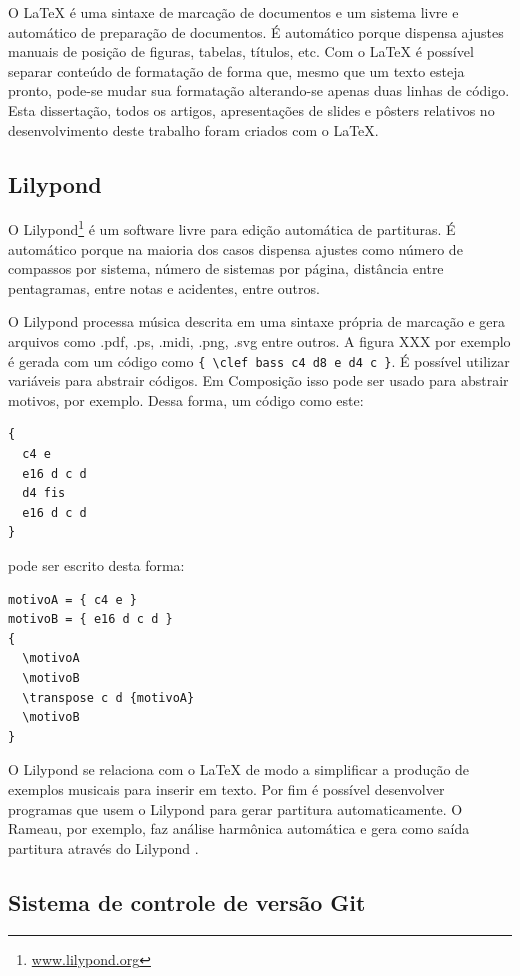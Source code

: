 O \LaTeX{} é uma sintaxe de marcação de documentos e um sistema livre
e automático de preparação de documentos. É automático porque dispensa
ajustes manuais de posição de figuras, tabelas, títulos, etc. Com o
\LaTeX{} é possível separar conteúdo de formatação de forma que, mesmo
que um texto esteja pronto, pode-se mudar sua formatação alterando-se
apenas duas linhas de código. Esta dissertação, todos os artigos,
apresentações de slides e pôsters relativos no desenvolvimento deste
trabalho foram criados com o \LaTeX{}.

\subsection{Lilypond}
\label{sec:lilypond}

O Lilypond\footnote{\url{www.lilypond.org}} é um software livre para
edição automática de partituras. É automático porque na maioria dos
casos dispensa ajustes como número de compassos por sistema, número de
sistemas por página, distância entre pentagramas, entre notas e
acidentes, entre outros.

O Lilypond processa música descrita em uma sintaxe própria de marcação
e gera arquivos como .pdf, .ps, .midi, .png, .svg entre outros. A
figura XXX por exemplo é gerada com um código como
\verb!{ \clef bass c4 d8 e d4 c }!. É possível utilizar variáveis para
abstrair códigos. Em Composição isso pode ser usado para abstrair
motivos, por exemplo. Dessa forma, um código como este:

\begin{verbatim}
{
  c4 e
  e16 d c d
  d4 fis
  e16 d c d
}
\end{verbatim}

pode ser escrito desta forma:

\begin{verbatim}
motivoA = { c4 e }
motivoB = { e16 d c d }
{
  \motivoA
  \motivoB
  \transpose c d {motivoA}
  \motivoB
}
\end{verbatim}

O Lilypond se relaciona com o \LaTeX{} de modo a simplificar a
produção de exemplos musicais para inserir em texto. Por fim é
possível desenvolver programas que usem o Lilypond para gerar
partitura automaticamente. O Rameau, por exemplo, faz análise
harmônica automática e gera como saída partitura através do Lilypond
\cite{kroger08:rameau}.

\subsection{Sistema de controle de versão Git}
\label{sec:sistema-de-controle}

